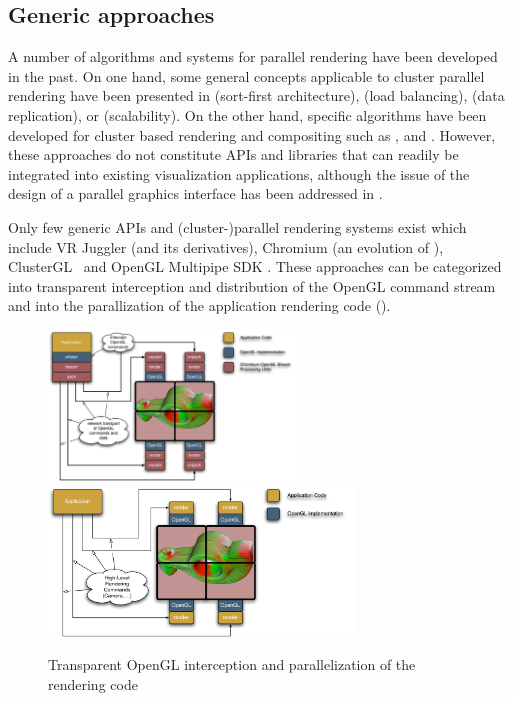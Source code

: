 \subsection{Generic approaches}

A number of algorithms and systems for parallel rendering have been developed in
the past. On one hand, some general concepts applicable to cluster parallel
rendering have been presented in \cite{Mueller:95,Mueller:97} (sort-first
architecture), \cite{SZFLS:99,SFLS:00} (load balancing), \cite{SFL:01} (data
replication), or \cite{CMF:05,CM:06} (scalability). On the other hand, specific
algorithms have been developed for cluster based rendering and compositing such
as \cite{AP:98}, \cite{CKS:02} and \cite{YYC:01,SMLAP:03}. However, these
approaches do not constitute APIs and libraries that can readily be integrated
into existing visualization applications, although the issue of the design of a
parallel graphics interface has been addressed in \cite{Igehy98}.

Only few generic APIs and (cluster-)parallel rendering systems exist which
include VR Juggler \cite{BJHMBC:01} (and its derivatives), Chromium
\cite{HHNFAKK:02} (an evolution of \cite{Humphreys99,Humphreys00,HEBSEH:01}),
{ClusterGL}~\cite{NHM:11} and OpenGL Multipipe SDK
\cite{JDBJBCER:04,BRE:05,MPK}. These approaches can be categorized into
transparent interception and distribution of the OpenGL command stream and into
the parallization of the application rendering code ().

\begin{figure}[ht]
 \includegraphics[height=4cm]{images/Chromium}\hfil%
 \includegraphics[height=4cm]{images/MPK}%
 \caption{Transparent OpenGL interception and parallelization of the rendering code\label{fChromium}}
\end{figure}


